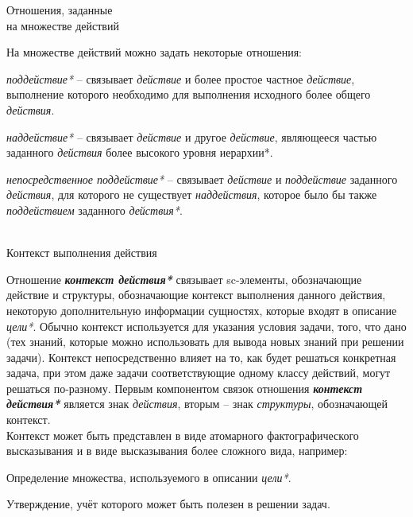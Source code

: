 \begin{frame}{Отношения, заданные \\на множестве действий}
\topline
\justifying
\vspace{10mm}

    На множестве действий можно задать некоторые отношения:
    \begin{textitemize}
        \item \textit{поддействие*} -- связывает \textit{действие} и более простое частное \textit{действие}, выполнение которого необходимо для выполнения исходного более общего \textit{действия}.
        \item \textit{наддействие*} -- связывает \textit{действие} и другое \textit{действие}, являющееся частью заданного \textit{действия} более высокого уровня иерархии*.
        \item \textit{непосредственное поддействие*} -- связывает \textit{действие} и \textit{поддействие} заданного \textit{действия}, для которого не существует \textit{наддействия}, которое было бы также \textit{поддействием} заданного \textit{действия*}.
    \end{textitemize}
\end{frame}

\begin{frame}{\\Контекст выполнения действия}
\topline
\justifying

 \vspace{10mm}
    Отношение \textbf{\textit{контекст действия*}} связывает sc-элементы, обозначающие действие и структуры, обозначающие контекст выполнения данного действия, некоторую дополнительную информации сущностях, которые входят в описание \textit{цели*}. Обычно контекст используется для указания условия задачи, того, что дано (тех знаний, которые можно использовать для вывода новых знаний при решении задачи). Контекст непосредственно влияет на то, как будет решаться конкретная задача, при этом даже задачи соответствующие одному классу действий, могут решаться по-разному.
    Первым компонентом связок отношения \textbf{\textit{контекст действия*}} является знак \textit{действия}, вторым -- знак \textit{структуры}, обозначающей контекст.\\
    Контекст может быть представлен в виде атомарного фактографического высказывания и в виде высказывания более сложного вида, например:
    \begin{textitemize}
        \item Определение множества, используемого в описании \textit{цели*}.
        \item Утверждение, учёт которого может быть полезен в решении задач.
    \end{textitemize}
\end{frame}

